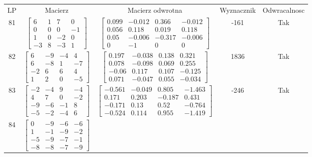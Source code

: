 \documentclass[a4paper,12pt]{article}
\begin{document}
\bgroup {} \vspace{0.2in} \begin{tabular}{c c c c c}
LP & Macierz & Macierz odwrotna & Wyznacznik & Odwracalnosc\\
81
&
$\begin{bmatrix} 6 & 1 & 7 & 0 \\ 0 & 0 & 0 & -1 \\ 1 & 0 & -2 & 0 \\ -3 & 8 & -3 & 1 \end{bmatrix}$
&
$\begin{bmatrix} 0.099 & -0.012 & 0.366 & -0.012 \\ 0.056 & 0.118 & 0.019 & 0.118 \\ 0.05 & -0.006 & -0.317 & -0.006 \\ 0 & -1 & 0 & 0 \end{bmatrix}$
&
-161
&
Tak
\\
82
&
$\begin{bmatrix} 6 & -9 & -4 & 4 \\ 6 & -8 & 1 & -7 \\ -2 & 6 & 6 & 4 \\ 1 & 2 & 0 & -5 \end{bmatrix}$
&
$\begin{bmatrix} 0.197 & -0.038 & 0.138 & 0.321 \\ 0.078 & -0.098 & 0.069 & 0.255 \\ -0.06 & 0.117 & 0.107 & -0.125 \\ 0.071 & -0.047 & 0.055 & -0.034 \end{bmatrix}$
&
1836
&
Tak
\\
83
&
$\begin{bmatrix} -2 & -4 & 9 & -4 \\ 4 & 7 & 0 & -2 \\ -9 & -6 & -1 & 8 \\ -5 & -2 & -4 & 6 \end{bmatrix}$
&
$\begin{bmatrix} -0.561 & -0.049 & 0.805 & -1.463 \\ 0.171 & 0.203 & -0.187 & 0.431 \\ -0.171 & 0.13 & 0.52 & -0.764 \\ -0.524 & 0.114 & 0.955 & -1.419 \end{bmatrix}$
&
-246
&
Tak
\\
84
&
$\begin{bmatrix} 0 & -9 & -6 & -6 \\ 1 & -1 & -9 & -2 \\ -5 & -9 & -7 & -1 \\ -8 & -8 & -7 & -9 \end{bmatrix}$

\end{tabular}
\end{document}
